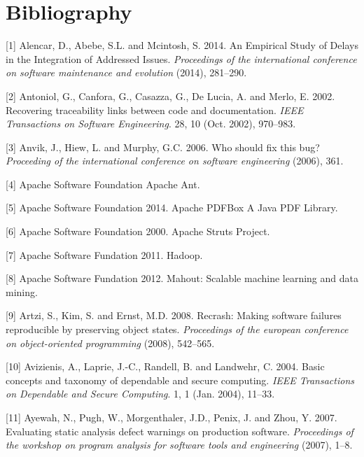 \documentclass[12pt]{report}
\begin{document}
\section*{Bibliography}

\setlength{\parindent}{0pt}

\hypertarget{refs}{}
\hypertarget{ref-Alencar2014}{}
{[}1{]} Alencar, D., Abebe, S.L. and Mcintosh, S. 2014. An Empirical
Study of Delays in the Integration of Addressed Issues.
\emph{Proceedings of the international conference on software
maintenance and evolution} (2014), 281--290.

\hypertarget{ref-Antoniol2002}{}
{[}2{]} Antoniol, G., Canfora, G., Casazza, G., De Lucia, A. and Merlo,
E. 2002. Recovering traceability links between code and documentation.
\emph{IEEE Transactions on Software Engineering}. 28, 10 (Oct. 2002),
970--983.

\hypertarget{ref-Anvik2006}{}
{[}3{]} Anvik, J., Hiew, L. and Murphy, G.C. 2006. Who should fix this
bug? \emph{Proceeding of the international conference on software
engineering} (2006), 361.

\hypertarget{ref-ApacheSoftwareFoundation}{}
{[}4{]} Apache Software Foundation Apache Ant.

\hypertarget{ref-ApacheSoftwareFoundation2014}{}
{[}5{]} Apache Software Foundation 2014. Apache PDFBox \textbar{} A Java
PDF Library.

\hypertarget{ref-ApacheSoftwareFoundation2000}{}
{[}6{]} Apache Software Foundation 2000. Apache Struts Project.

\hypertarget{ref-hadoop2011hadoop}{}
{[}7{]} Apache Software Fundation 2011. Hadoop.

\hypertarget{ref-mahout2012scalable}{}
{[}8{]} Apache Software Fundation 2012. Mahout: Scalable machine
learning and data mining.

\hypertarget{ref-Artzi2008}{}
{[}9{]} Artzi, S., Kim, S. and Ernst, M.D. 2008. Recrash: Making
software failures reproducible by preserving object states.
\emph{Proceedings of the european conference on object-oriented
programming} (2008), 542--565.

\hypertarget{ref-Avizienis2004}{}
{[}10{]} Avizienis, A., Laprie, J.-C., Randell, B. and Landwehr, C.
2004. Basic concepts and taxonomy of dependable and secure computing.
\emph{IEEE Transactions on Dependable and Secure Computing}. 1, 1 (Jan.
2004), 11--33.

\hypertarget{ref-Ayewah2007}{}
{[}11{]} Ayewah, N., Pugh, W., Morgenthaler, J.D., Penix, J. and Zhou,
Y. 2007. Evaluating static analysis defect warnings on production
software. \emph{Proceedings of the workshop on program analysis for
software tools and engineering} (2007), 1--8.
\end{document}
